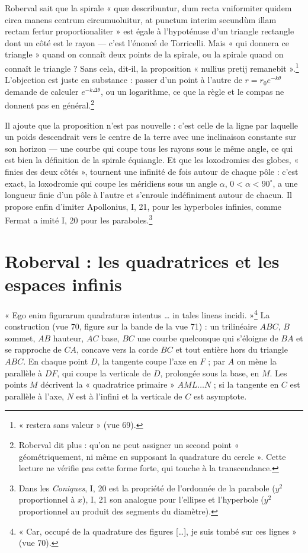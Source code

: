 \documentclass[11pt,a4paper]{article}
\begin{document}
Roberval sait que la spirale « quæ describuntur, dum recta vniformiter quidem circa
manens centrum circumuoluitur, at punctum interim secundùm illam rectam fertur
proportionaliter » est égale à l'hypoténuse d'un triangle rectangle dont un côté
est le rayon — c'est l'énoncé de Torricelli. Mais « qui donnera ce triangle »
quand on connaît deux points de la spirale, ou la spirale quand on connaît le
triangle ? Sans cela, dit-il, la proposition « nullius pretij
remanebit ».\footnote{« restera sans valeur » (vue 69).} L'objection est juste en
substance : passer d'un point à l'autre de $r=r_0e^{-k\theta}$ demande de
calculer $e^{-k\Delta\theta}$, ou un logarithme, ce que la règle et le compas ne
donnent pas en général.\footnote{Roberval dit plus : qu'on ne peut assigner un
second point « géométriquement, ni même en supposant la quadrature du cercle ».
Cette lecture ne vérifie pas cette forme forte, qui touche à la transcendance.}

Il ajoute que la proposition n'est pas nouvelle : c'est celle de la ligne par
laquelle un poids descendrait vers le centre de la terre avec une inclinaison
constante sur son horizon — une courbe qui coupe tous les rayons sous le même
angle, ce qui est bien la définition de la spirale équiangle. Et que les
loxodromies des globes, « finies des deux côtés », tournent une infinité de fois
autour de chaque pôle : c'est exact, la loxodromie qui coupe les méridiens sous un
angle $\alpha$, $0<\alpha<90^\circ$, a une longueur finie d'un pôle à l'autre et s'enroule
indéfiniment autour de chacun. Il propose enfin d'imiter Apollonius, I, 21, pour
les hyperboles infinies, comme Fermat a imité I, 20 pour les
paraboles.\footnote{Dans les \emph{Coniques}, I, 20 est la propriété de
l'ordonnée de la parabole ($y^2$ proportionnel à $x$), I, 21 son analogue pour
l'ellipse et l'hyperbole ($y^2$ proportionnel au produit des segments du
diamètre).}

\section*{Roberval : les quadratrices et les espaces infinis}

« Ego enim figurarum quadraturæ intentus \ldots{} in tales lineas
incidi. »\footnote{« Car, occupé de la quadrature des figures [\ldots], je suis
tombé sur ces lignes » (vue 70).} La construction (vue 70, figure sur la bande
de la vue 71) : un trilinéaire $ABC$, $B$ sommet, $AB$ hauteur, $AC$ base, $BC$
une courbe quelconque qui s'éloigne de $BA$ et se rapproche de $CA$, concave vers
la corde $BC$ et tout entière hors du triangle $ABC$. En chaque point $D$, la tangente coupe l'axe en $F$ ; par $A$ on
mène la parallèle à $DF$, qui coupe la verticale de $D$, prolongée sous la base,
en $M$. Les points $M$ décrivent la « quadratrice primaire » $AML\ldots N$ ; si la
tangente en $C$ est parallèle à l'axe, $N$ est à l'infini et la verticale de $C$
est asymptote.
\end{document}
